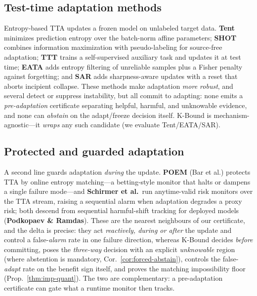 \documentclass[conference]{IEEEtran}
\theoremstyle{plain}
\theoremstyle{definition}
\begin{document}
\subsection{Test-time adaptation methods}
Entropy-based TTA updates a frozen model on unlabeled target data. \textbf{Tent} minimizes
prediction entropy over the batch-norm affine parameters; \textbf{SHOT} combines information
maximization with pseudo-labeling for source-free adaptation; \textbf{TTT} trains a
self-supervised auxiliary task and updates it at test time; \textbf{EATA} adds entropy
filtering of unreliable samples plus a Fisher penalty against forgetting; and \textbf{SAR}
adds sharpness-aware updates with a reset that aborts incipient collapse. These methods make
adaptation \emph{more robust}, and several detect or suppress instability, but all commit to
adapting: none emits a \emph{pre-adaptation} certificate separating helpful, harmful, and
unknowable evidence, and none can \emph{abstain} on the adapt/freeze decision itself. K-Bound
is mechanism-agnostic---it \emph{wraps} any such candidate (we evaluate Tent/EATA/SAR).

\subsection{Protected and guarded adaptation}
A second line guards adaptation \emph{during} the update. \textbf{POEM} (Bar et al.)
protects TTA by online entropy matching---a betting-style monitor that halts or dampens a
single failure mode---and \textbf{Schirmer et al.}\ run anytime-valid risk monitors over the
TTA stream, raising a sequential alarm when adaptation degrades a proxy risk; both descend
from sequential harmful-shift tracking for deployed models (\textbf{Podkopaev \& Ramdas}).
These are the nearest neighbours of our certificate, and the delta is precise: they act
\emph{reactively, during or after} the update and control a false-\emph{alarm} rate in one
failure direction, whereas K-Bound decides \emph{before} committing, poses the
\emph{three-way} decision with an explicit \emph{unknowable} region (where abstention is
mandatory, Cor.~\ref{cor:forced-abstain}), controls the false-\emph{adapt} rate on the
benefit sign itself, and proves the matching impossibility floor
(Prop.~\ref{thm:imp-quant}). The two are complementary: a pre-adaptation certificate can
gate what a runtime monitor then tracks.
\end{document}
